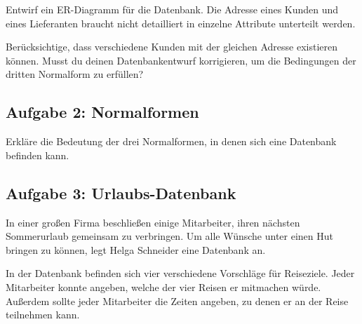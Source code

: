 \begin{compactenum}[a)]
\item Entwirf ein ER-Diagramm für die Datenbank. Die Adresse eines Kunden und
eines Lieferanten braucht nicht detailliert in einzelne Attribute unterteilt
werden.
\item Berücksichtige, dass verschiedene Kunden mit der gleichen Adresse
existieren können. Musst du deinen Datenbankentwurf korrigieren, um die
Bedingungen der dritten Normalform zu erfüllen?
\end{compactenum}


\subsection{Aufgabe 2: Normalformen}

Erkläre die Bedeutung der drei Normalformen, in denen sich eine Datenbank befinden kann.


\subsection{Aufgabe 3: Urlaubs-Datenbank}

In einer großen Firma beschließen einige Mitarbeiter, ihren nächsten
Sommerurlaub gemeinsam zu verbringen. Um alle Wünsche unter einen Hut bringen zu
können, legt Helga Schneider eine Datenbank an.

In der Datenbank befinden sich vier verschiedene Vorschläge für Reiseziele.
Jeder Mitarbeiter konnte angeben, welche der vier Reisen er mitmachen würde.
Außerdem sollte jeder Mitarbeiter die Zeiten angeben, zu denen er an der Reise
teilnehmen kann.

